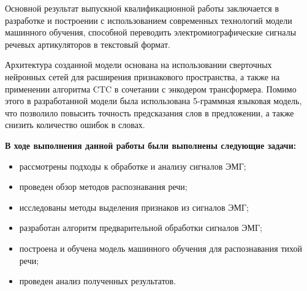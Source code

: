 
Основной результат выпускной квалификационной работы заключается в разработке и построении с использованием современных технологий модели машинного обучения, способной переводить электромиографические сигналы речевых артикуляторов в текстовый формат. 

Архитектура созданной модели основана на использовании сверточных нейронных сетей для расширения признакового пространства, а также на применении алгоритма CTC в сочетании с энкодером трансформера.
Помимо этого в разработанной модели была использована 5-граммная языковая модель, что позволило повысить точность предсказания слов в предложении, а также снизить количество ошибок в словах.

\noindent\textbf{В ходе выполнения данной работы были выполнены следующие задачи:}

\vspace{0.2em-\topsep}
\begin{itemize}
    \item рассмотрены подходы к обработке и анализу сигналов ЭМГ;
    \item проведен обзор методов распознавания речи;
    \item исследованы методы выделения признаков из сигналов ЭМГ;
    \item разработан алгоритм предварительной обработки сигналов ЭМГ;
    \item построена и обучена модель машинного обучения для распознавания тихой речи;
    \item проведен анализ полученных результатов.
\end{itemize}


